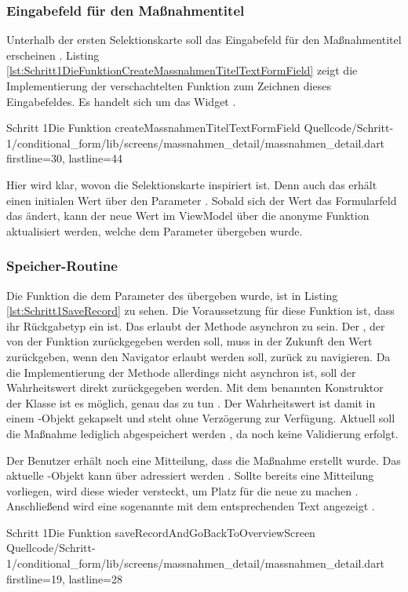 \subsubsection{Eingabefeld für den Maßnahmentitel}


Unterhalb der ersten Selektionskarte soll das Eingabefeld für den Maßnahmentitel erscheinen . Listing \ref{lst:Schritt1DieFunktionCreateMassnahmenTitelTextFormField} zeigt die Implementierung der verschachtelten Funktion zum Zeichnen dieses Eingabefeldes.  Es handelt sich um das Widget  . 

\begin{alexlisting}{Schritt 1}{Die Funktion createMassnahmenTitelTextFormField}
  {Quellcode/Schritt-1/conditional_form/lib/screens/massnahmen_detail/massnahmen_detail.dart}
  {firstline=30, lastline=44}
  \label{lst:Schritt1DieFunktionCreateMassnahmenTitelTextFormField}
\end{alexlisting}

Hier wird klar, wovon die Selektionskarte inspiriert ist. Denn auch das  erhält einen initialen Wert über den Parameter . Sobald sich der Wert das Formularfeld das ändert, kann der neue Wert im ViewModel über die anonyme Funktion aktualisiert werden, welche dem Parameter  übergeben wurde. 

\subsubsection{Speicher-Routine}


Die Funktion die dem Parameter  des  übergeben wurde, ist in Listing \ref{lst:Schritt1SaveRecord} zu sehen. Die Voraussetzung für diese Funktion ist, dass ihr Rückgabetyp ein  ist. Das erlaubt der Methode asynchron zu sein. Der , der von der Funktion zurückgegeben werden soll, muss in der Zukunft den Wert  zurückgeben, wenn den Navigator erlaubt  werden soll, zurück zu navigieren. Da die Implementierung der Methode allerdings nicht asynchron ist, soll der Wahrheitswert direkt zurückgegeben werden. Mit dem benannten Konstruktor  der Klasse  ist es möglich, genau das zu tun .  Der Wahrheitswert ist damit in einem -Objekt gekapselt und steht ohne Verzögerung zur Verfügung. Aktuell soll die Maßnahme lediglich abgespeichert werden , da noch keine Validierung erfolgt.

Der Benutzer erhält noch eine Mitteilung, dass die Maßnahme erstellt wurde. Das aktuelle -Objekt kann über  adressiert werden . Sollte bereits eine Mitteilung vorliegen, wird diese wieder versteckt, um Platz für die neue zu machen . Anschließend wird eine sogenannte  mit dem entsprechenden Text angezeigt .

\begin{alexlisting}{Schritt 1}{Die Funktion saveRecordAndGoBackToOverviewScreen}
  {Quellcode/Schritt-1/conditional_form/lib/screens/massnahmen_detail/massnahmen_detail.dart}
  {firstline=19, lastline=28}
  \label{lst:Schritt1SaveRecord}
\end{alexlisting}

\clearpage
